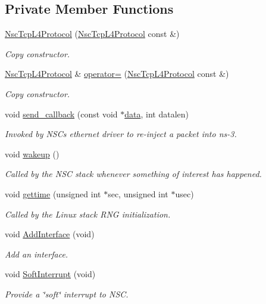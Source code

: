 \subsection*{Private Member Functions}
\begin{DoxyCompactItemize}
\item 
\hyperlink{classns3_1_1NscTcpL4Protocol_a4840ae8f2484e1065369e833f2ae67d9}{Nsc\+Tcp\+L4\+Protocol} (\hyperlink{classns3_1_1NscTcpL4Protocol}{Nsc\+Tcp\+L4\+Protocol} const \&)
\begin{DoxyCompactList}\small\item\em Copy constructor. \end{DoxyCompactList}\item 
\hyperlink{classns3_1_1NscTcpL4Protocol}{Nsc\+Tcp\+L4\+Protocol} \& \hyperlink{classns3_1_1NscTcpL4Protocol_a940a73dff284d2bd495bf0e1f3b0f52b}{operator=} (\hyperlink{classns3_1_1NscTcpL4Protocol}{Nsc\+Tcp\+L4\+Protocol} const \&)
\begin{DoxyCompactList}\small\item\em Copy constructor. \end{DoxyCompactList}\item 
void \hyperlink{classns3_1_1NscTcpL4Protocol_a70989e2cc0ea4651fb8a3d24bd9b07a8}{send\+\_\+callback} (const void $\ast$\hyperlink{topology-example-sim_8cc_a26c65296e316af77b787dc77469bb2a4}{data}, int datalen)
\begin{DoxyCompactList}\small\item\em Invoked by N\+S\+Cs \textquotesingle{}ethernet driver\textquotesingle{} to re-\/inject a packet into ns-\/3. \end{DoxyCompactList}\item 
void \hyperlink{classns3_1_1NscTcpL4Protocol_abee896715eb7604e550775a488c1b329}{wakeup} ()
\begin{DoxyCompactList}\small\item\em Called by the N\+SC stack whenever something of interest has happened. \end{DoxyCompactList}\item 
void \hyperlink{classns3_1_1NscTcpL4Protocol_a72d7f72fb9687c791a1a6d92ce0c0c85}{gettime} (unsigned int $\ast$sec, unsigned int $\ast$usec)
\begin{DoxyCompactList}\small\item\em Called by the Linux stack R\+NG initialization. \end{DoxyCompactList}\item 
void \hyperlink{classns3_1_1NscTcpL4Protocol_a4262e16098e30c8744d146f45d6e13f8}{Add\+Interface} (void)
\begin{DoxyCompactList}\small\item\em Add an interface. \end{DoxyCompactList}\item 
void \hyperlink{classns3_1_1NscTcpL4Protocol_a8b0f5c0507ff60818b2dfa1a6b110d75}{Soft\+Interrupt} (void)
\begin{DoxyCompactList}\small\item\em Provide a \char`\"{}soft\char`\"{} interrupt to N\+SC. \end{DoxyCompactList}\end{DoxyCompactItemize}
